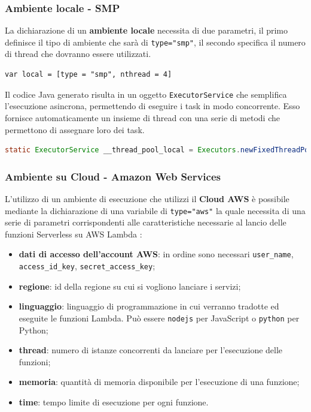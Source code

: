 \subsubsection{Ambiente locale - SMP}
La dichiarazione di un \textbf{ambiente locale} necessita di due parametri, il primo definisce il tipo di ambiente che sarà di \verb|type|\verb|=|\verb|"smp"|, il secondo specifica il numero di thread che dovranno essere utilizzati.\\

\begin{lstlisting}[language=FLY,caption={Dichiarazione di un ambiente di esecuzione locale.}, label={lst:smp}]
var local = [type = "smp", nthread = 4]
\end{lstlisting}

Il codice Java generato risulta in un oggetto \verb|ExecutorService| che semplifica l'esecuzione asincrona, permettendo di eseguire i task in modo concorrente. Esso fornisce automaticamente un insieme di thread con una serie di metodi che permettono di assegnare loro dei task.\\

\begin{lstlisting}[language=Java,caption={Codice generato per l'ambiente di esecuzione locale.}, label={lst:localJava}]
static ExecutorService __thread_pool_local = Executors.newFixedThreadPool(4);
\end{lstlisting}

\subsubsection{Ambiente su Cloud - Amazon Web Services}
L'utilizzo di un ambiente di esecuzione che utilizzi il \textbf{Cloud AWS} è possibile mediante la dichiarazione di una variabile di \verb|type|\verb|=|\verb|"aws"| la quale necessita di una serie di parametri corrispondenti alle caratteristiche necessarie al lancio delle funzioni Serverless su AWS Lambda \cite{LambdaConfiguration}:

\begin{itemize}
    \item \textbf{dati di accesso dell'account AWS}: in ordine sono necessari \verb|user_name|, \verb| access_id_key|, \verb|secret_access_key|;
    \item \textbf{regione}: id della regione su cui si vogliono lanciare i servizi;
    \item \textbf{linguaggio}: linguaggio di programmazione in cui verranno tradotte ed eseguite le funzioni Lambda. Può essere \verb|nodejs| per JavaScript o \verb|python| per Python;
    \item \textbf{thread}: numero di istanze concorrenti da lanciare per l'esecuzione delle funzioni;
    \item \textbf{memoria}: quantità di memoria disponibile per l'esecuzione di una funzione;
    \item \textbf{time}: tempo limite di esecuzione per ogni funzione.
\end{itemize}



